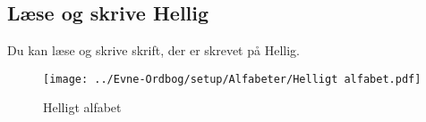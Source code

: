 \subsection{Læse og skrive Hellig}
Du kan læse og skrive skrift, der er skrevet på Hellig.\\
\begin{figure}[H]
    \centering
    \texttt{[image: ../Evne-Ordbog/setup/Alfabeter/Helligt alfabet.pdf]}
    \caption{Helligt alfabet}
\end{figure}